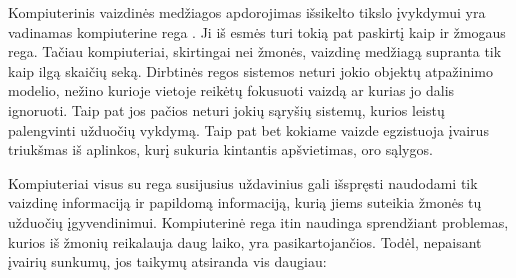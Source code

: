 \documentclass[a4paper,12pt]{article}
\begin{document}
Kompiuterinis vaizdinės medžiagos apdorojimas išsikelto tikslo įvykdymui yra vadinamas kompiuterine rega \cite{OPENCV}. Ji iš esmės turi tokią pat paskirtį kaip ir žmogaus rega. Tačiau kompiuteriai, skirtingai nei žmonės, vaizdinę medžiagą supranta tik kaip ilgą skaičių seką. Dirbtinės regos sistemos neturi jokio objektų atpažinimo modelio, nežino kurioje vietoje reikėtų fokusuoti vaizdą ar kurias jo dalis ignoruoti. Taip pat jos pačios neturi jokių sąryšių sistemų, kurios leistų palengvinti užduočių vykdymą. Taip pat bet kokiame vaizde egzistuoja įvairus triukšmas iš aplinkos, kurį sukuria kintantis apšvietimas, oro sąlygos.

Kompiuteriai visus su rega susijusius uždavinius gali išspręsti naudodami tik vaizdinę informaciją ir papildomą informaciją, kurią jiems suteikia žmonės tų užduočių įgyvendinimui. Kompiuterinė rega itin naudinga sprendžiant problemas, kurios iš žmonių reikalauja daug laiko, yra pasikartojančios. Todėl, nepaisant įvairių sunkumų, jos taikymų atsiranda vis daugiau:
\end{document}
